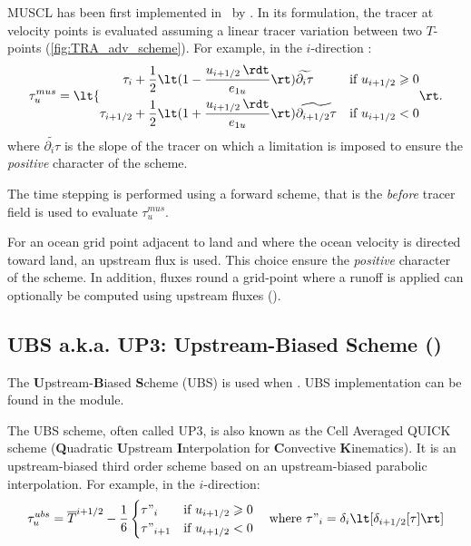 \documentclass[../main/NEMO_manual]{subfiles}
\begin{document}
MUSCL has been first implemented in \NEMO\ by \citet{levy.estublier.ea_GRL01}.
In its formulation, the tracer at velocity points is evaluated assuming
a linear tracer variation between two $T$-points (\autoref{fig:TRA_adv_scheme}).
For example, in the $i$-direction :
\[
  \tau_u^{mus} = \lt\{
  \begin{split}
    \tau_i        &+ \frac{1}{2} \lt( 1 - \frac{u_{i + 1/2} \, \rdt}{e_{1u}} \rt)
    \widetilde{\partial_i        \tau} & \text{if~} u_{i + 1/2} \geqslant 0 \\
    \tau_{i + 1/2} &+ \frac{1}{2} \lt( 1 + \frac{u_{i + 1/2} \, \rdt}{e_{1u}} \rt)
    \widetilde{\partial_{i + 1/2} \tau} & \text{if~} u_{i + 1/2} <         0
  \end{split}
                                                                                                      \rt.
\]
where $\widetilde{\partial_i \tau}$ is the slope of the tracer on which
a limitation is imposed to ensure the \textit{positive} character of the scheme.

The time stepping is performed using a forward scheme,
that is the \textit{before} tracer field is used to evaluate $\tau_u^{mus}$.

For an ocean grid point adjacent to land and where the ocean velocity is directed toward land,
an upstream flux is used.
This choice ensure the \textit{positive} character of the scheme.
In addition, fluxes round a grid-point where a runoff is applied can optionally be computed using
upstream fluxes ().

\subsection[UBS a.k.a. UP3: Upstream-Biased Scheme (\forcode{ln_traadv_ubs})]{UBS a.k.a. UP3: Upstream-Biased Scheme (\protect{})}
\label{subsec:TRA_adv_ubs}

The \textbf{U}pstream-\textbf{B}iased \textbf{S}cheme (UBS) is used when
.
UBS implementation can be found in the  module.

The UBS scheme, often called UP3, is also known as the Cell Averaged QUICK scheme
(\textbf{Q}uadratic \textbf{U}pstream \textbf{I}nterpolation for
\textbf{C}onvective \textbf{K}inematics).
It is an upstream-biased third order scheme based on an upstream-biased parabolic interpolation.
For example, in the $i$-direction:
\begin{equation}
  \label{eq:TRA_adv_ubs}
  \tau_u^{ubs} = \overline T ^{i + 1/2} - \frac{1}{6}
    \begin{cases}
      \tau"_i       & \text{if~} u_{i + 1/2} \geqslant 0 \\
      \tau"_{i + 1} & \text{if~} u_{i + 1/2} <         0
    \end{cases}
  \quad \text{where~} \tau"_i = \delta_i \lt[ \delta_{i + 1/2} [\tau] \rt]
\end{equation}
\end{document}
